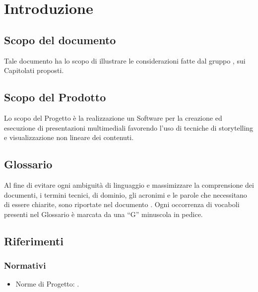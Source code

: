 \section{Introduzione}{
	\subsection{Scopo del documento}{
		Tale documento ha lo scopo di illustrare le considerazioni fatte dal gruppo \gruppo, sui Capitolati proposti.
	}
	\subsection{Scopo del Prodotto}{
		Lo scopo del Progetto è la realizzazione un Software per la creazione ed esecuzione di presentazioni multimediali favorendo l’uso di tecniche di storytelling e visualizzazione non lineare dei contenuti.
		}
	\subsection{Glossario}{
		Al fine di evitare ogni ambiguità di linguaggio e massimizzare la comprensione dei documenti, i termini tecnici, di dominio, gli acronimi e le parole che necessitano di essere chiarite, sono riportate nel documento \href{run:../../Esterni/\fGlossario}{\fEscapeGlossario}. Ogni occorrenza di vocaboli presenti nel Glossario è marcata da una “G” minuscola in pedice.
		}
	\subsection{Riferimenti}{
		\subsubsection{Normativi}{
			\begin{itemize}
				\item Norme di Progetto: \href{run:../../Interni/\fNormeDiProgetto}{\fEscapeNormeDiProgetto}.
			\end{itemize}
			}
}}
